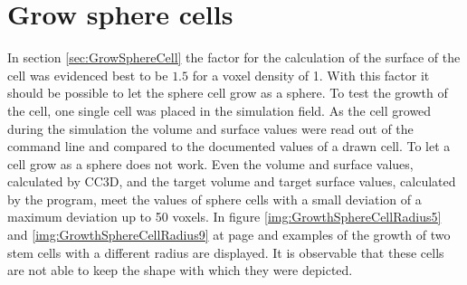 \section{Grow sphere cells}
In section \ref{sec:GrowSphereCell} the factor for the calculation of the surface of the cell was evidenced best to be $1.5$ for a voxel density of 1. With this factor it should be possible to let the sphere cell grow as a sphere. To test the growth of the cell, one single cell was placed in the simulation field. As the cell growed during the simulation the volume and surface values were read out of the command line and compared to the documented values of a drawn cell. \newline
To let a cell grow as a sphere does not work. Even the volume and surface values, calculated by \ac{CC3D}, and the target volume and target surface values, calculated by the program, meet the values of sphere cells with a small deviation of a maximum deviation up to 50 voxels. \newline
In figure \ref{img:GrowthSphereCellRadius5} and \ref{img:GrowthSphereCellRadius9} at page \pageref{img:GrowthSphereCellRadius5} and \pageref{img:GrowthSphereCellRadius9} examples of the growth of two stem cells with a different radius are displayed. It is observable that these cells are not able to keep the shape with which they were depicted.


